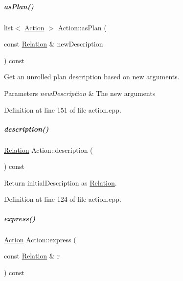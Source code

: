 \mbox{\label{group__icubclient__representations_a260238c3bc643b27a5f6f5001ebf1444}} 
\subparagraph{\texorpdfstring{as\+Plan()}{asPlan()}\hspace{0.1cm}{\footnotesize\ttfamily [2/2]}}
{\footnotesize\ttfamily list$<$ \hyperlink{group__icubclient__representations_classicubclient_1_1Action}{Action} $>$ Action\+::as\+Plan (\begin{DoxyParamCaption}\item[{const \hyperlink{group__icubclient__representations_classicubclient_1_1Relation}{Relation} \&}]{new\+Description }\end{DoxyParamCaption}) const\hspace{0.3cm}{\ttfamily [virtual]}}



Get an unrolled plan description based on new arguments. 


\begin{DoxyParams}{Parameters}
{\em new\+Description} & The new arguments \\
\hline
\end{DoxyParams}


Definition at line 151 of file action.\+cpp.

\mbox{\label{group__icubclient__representations_adbf6f29ba5b1111e1e8e28391badbda3}} 
\subparagraph{\texorpdfstring{description()}{description()}}
{\footnotesize\ttfamily \hyperlink{group__icubclient__representations_classicubclient_1_1Relation}{Relation} Action\+::description (\begin{DoxyParamCaption}{ }\end{DoxyParamCaption}) const}



Return initial\+Description as \hyperlink{group__icubclient__representations_classicubclient_1_1Relation}{Relation}. 



Definition at line 124 of file action.\+cpp.

\mbox{\label{group__icubclient__representations_a9974e0796b2b1d647c3670a9adaf306d}} 
\subparagraph{\texorpdfstring{express()}{express()}}
{\footnotesize\ttfamily \hyperlink{group__icubclient__representations_classicubclient_1_1Action}{Action} Action\+::express (\begin{DoxyParamCaption}\item[{const \hyperlink{group__icubclient__representations_classicubclient_1_1Relation}{Relation} \&}]{r }\end{DoxyParamCaption}) const}



